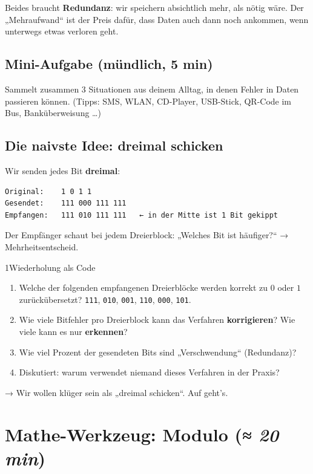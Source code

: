 Beides braucht \textbf{Redundanz}: wir speichern absichtlich mehr, als
nötig wäre. Der „Mehraufwand“ ist der Preis dafür, dass Daten auch
dann noch ankommen, wenn unterwegs etwas verloren geht.

\subsection*{Mini-Aufgabe (mündlich, 5 min)}

Sammelt zusammen 3 Situationen aus deinem Alltag, in denen Fehler in
Daten passieren können. (Tipps: SMS, WLAN, CD-Player, USB-Stick,
QR-Code im Bus, Banküberweisung \dots)

\subsection*{Die naivste Idee: dreimal schicken}

Wir senden jedes Bit \textbf{dreimal}:

\begin{verbatim}
Original:    1 0 1 1
Gesendet:    111 000 111 111
Empfangen:   111 010 111 111   ← in der Mitte ist 1 Bit gekippt
\end{verbatim}

Der Empfänger schaut bei jedem Dreierblock: „Welches Bit ist häufiger?“
→ Mehrheitsentscheid.

\begin{bleistiftuebung}{1}{Wiederholung als Code}
\begin{enumerate}[leftmargin=*]
\item Welche der folgenden empfangenen Dreierblöcke werden korrekt zu
  $0$ oder $1$ zurückübersetzt?
  \texttt{111}, \texttt{010}, \texttt{001}, \texttt{110}, \texttt{000},
  \texttt{101}.
\item Wie viele Bitfehler pro Dreierblock kann das Verfahren
  \textbf{korrigieren}? Wie viele kann es nur \textbf{erkennen}?
\item Wie viel Prozent der gesendeten Bits sind „Verschwendung“
  (Redundanz)?
\item Diskutiert: warum verwendet niemand dieses Verfahren in der
  Praxis?
\end{enumerate}
\end{bleistiftuebung}

→ Wir wollen klüger sein als „dreimal schicken“. Auf geht's.

\section{Mathe-Werkzeug: Modulo \normalfont(\textit{≈ 20 min})}

